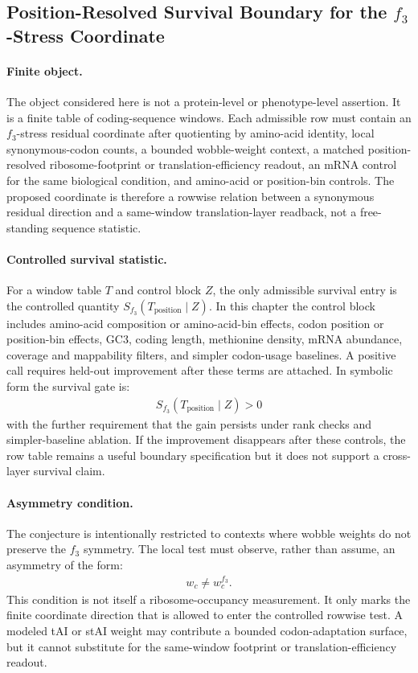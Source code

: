 \subsection{Position-Resolved Survival Boundary for the $f_3$-Stress Coordinate}
\label{sec:q6-f3-stress-position-resolved-translation-survival-cross-layer}

\paragraph{Finite object.}
The object considered here is not a protein-level or phenotype-level assertion.  It is a finite table of coding-sequence windows.  Each admissible row must contain an $f_3$-stress residual coordinate after quotienting by amino-acid identity, local synonymous-codon counts, a bounded wobble-weight context, a matched position-resolved ribosome-footprint or translation-efficiency readout, an mRNA control for the same biological condition, and amino-acid or position-bin controls.  The proposed coordinate is therefore a rowwise relation between a synonymous residual direction and a same-window translation-layer readback, not a free-standing sequence statistic.

\paragraph{Controlled survival statistic.}
For a window table $T$ and control block $Z$, the only admissible survival entry is the controlled quantity $S_{f_3}(T_{\mathrm{position}}\mid Z)$.  In this chapter the control block includes amino-acid composition or amino-acid-bin effects, codon position or position-bin effects, GC3, coding length, methionine density, mRNA abundance, coverage and mappability filters, and simpler codon-usage baselines.  A positive call requires held-out improvement after these terms are attached.  In symbolic form the survival gate is:
$$
\begin{aligned}
S_{f_3}(T_{\mathrm{position}}\mid Z) > 0
\end{aligned}
$$
with the further requirement that the gain persists under rank checks and simpler-baseline ablation.  If the improvement disappears after these controls, the row table remains a useful boundary specification but it does not support a cross-layer survival claim.

\paragraph{Asymmetry condition.}
The conjecture is intentionally restricted to contexts where wobble weights do not preserve the $f_3$ symmetry.  The local test must observe, rather than assume, an asymmetry of the form:
$$
\begin{aligned}
w_c \neq w_c^{f_3}.
\end{aligned}
$$
This condition is not itself a ribosome-occupancy measurement.  It only marks the finite coordinate direction that is allowed to enter the controlled rowwise test.  A modeled tAI or stAI weight may contribute a bounded codon-adaptation surface, but it cannot substitute for the same-window footprint or translation-efficiency readout.

